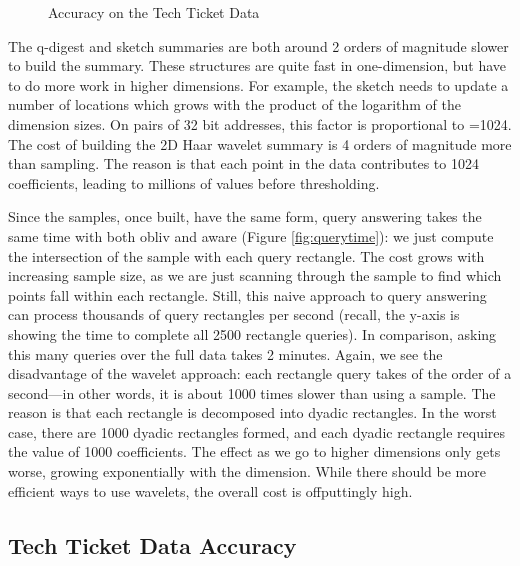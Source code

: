 \documentclass[11pt]{article}
\begin{document}
\begin{figure*}[t]
\hspace*{-6mm}
\caption{Accuracy on the Tech Ticket Data}
\label{fig:tech}
\end{figure*}

The q-digest and sketch summaries are both  around 2 orders of
magnitude slower to build the summary. 
These structures are quite fast in one-dimension, but have to do more
work in higher dimensions. 
For example, the sketch needs to update a number of locations which
grows with the product of the logarithm of the dimension sizes. 
On pairs of 32 bit addresses, this factor is proportional to
=1024. 
The cost of building the 2D Haar wavelet summary is 4 orders of magnitude
more than sampling. 
The reason is that each point in the data contributes to 1024
coefficients, leading to millions of values before thresholding. 


Since the samples, once built, have the same form, query answering
takes the same time with both obliv and aware (Figure
\ref{fig:querytime}): 
we just compute the
intersection of the sample with each query rectangle. 
The cost grows with increasing sample size, as we are just scanning
through the sample to find which points fall within each rectangle. 
Still, this naive approach to query answering can process thousands of
query rectangles per second (recall, the y-axis is showing the time to
complete all 2500 rectangle queries). 
In comparison, asking this many queries over the full data takes 2 minutes.
Again, we see the disadvantage of the wavelet approach: each rectangle
query takes of the order of a second---in other words, it is about
1000 times slower than using a sample. 
The reason is that each rectangle is decomposed into
dyadic rectangles.
In the worst case, there are 1000 dyadic rectangles formed, and each
dyadic rectangle requires  the value of 1000 coefficients. 
The effect as we go to higher dimensions only gets worse, growing
exponentially with the dimension.
While there should be more efficient ways to use wavelets, the overall
cost is offputtingly high. 

\subsection{Tech Ticket Data Accuracy}
\end{document}
